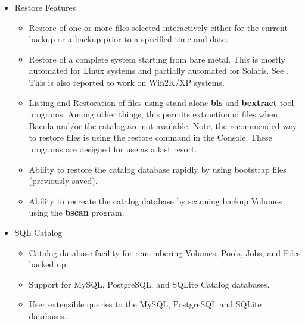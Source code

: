 \begin{itemize}
\item Restore Features
   \begin{itemize}
   \item Restore of one or more files selected interactively either for the
      current backup or a backup prior to a specified time and date.  
   \item Restore of a complete system starting from bare  metal. This is mostly
      automated for Linux systems and  partially automated for Solaris. See 
      . This is also
      reported to work on Win2K/XP systems.  
   \item Listing and Restoration of files using stand-alone {\bf bls} and {\bf
        bextract} tool programs. Among other things, this permits extraction of
      files when Bacula and/or the catalog are not available. Note, the
      recommended way to restore files is using the restore command in the
      Console. These programs are designed for use as a last resort.
   \item Ability to restore the catalog database rapidly by using bootstrap
      files (previously saved).
   \item Ability to recreate the catalog database by scanning backup Volumes 
      using the {\bf bscan} program.  
   \end{itemize}

\item SQL Catalog
   \begin{itemize}
   \item Catalog database facility for remembering Volumes, Pools, Jobs,  and
      Files backed up.  
   \item Support for MySQL, PostgreSQL, and SQLite Catalog databases.  
   \item User extensible queries to the MySQL, PostgreSQL and SQLite databases.  
   \end{itemize}


\end{itemize}
